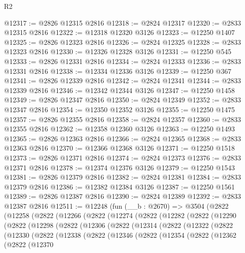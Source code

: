 \begin{lexlean}{R2}
\begin{coremodule}
@12317 := @2826 @12315 @2816
@12318 := @2824 @12317
@12320 := @2833 @12315 @2816
@12322 := @12318 @12320 @3126
@12323 := @12250 @1407
@12325 := @2826 @12323 @2816
@12326 := @2824 @12325
@12328 := @2833 @12323 @2816
@12330 := @12326 @12328 @3126
@12331 := @12250 @545
@12333 := @2826 @12331 @2816
@12334 := @2824 @12333
@12336 := @2833 @12331 @2816
@12338 := @12334 @12336 @3126
@12339 := @12250 @367
@12341 := @2826 @12339 @2816
@12342 := @2824 @12341
@12344 := @2833 @12339 @2816
@12346 := @12342 @12344 @3126
@12347 := @12250 @1458
@12349 := @2826 @12347 @2816
@12350 := @2824 @12349
@12352 := @2833 @12347 @2816
@12354 := @12350 @12352 @3126
@12355 := @12250 @1475
@12357 := @2826 @12355 @2816
@12358 := @2824 @12357
@12360 := @2833 @12355 @2816
@12362 := @12358 @12360 @3126
@12363 := @12250 @1493
@12365 := @2826 @12363 @2816
@12366 := @2824 @12365
@12368 := @2833 @12363 @2816
@12370 := @12366 @12368 @3126
@12371 := @12250 @1518
@12373 := @2826 @12371 @2816
@12374 := @2824 @12373
@12376 := @2833 @12371 @2816
@12378 := @12374 @12376 @3126
@12379 := @12250 @1543
@12381 := @2826 @12379 @2816
@12382 := @2824 @12381
@12384 := @2833 @12379 @2816
@12386 := @12382 @12384 @3126
@12387 := @12250 @1561
@12389 := @2826 @12387 @2816
@12390 := @2824 @12389
@12392 := @2833 @12387 @2816
@12511 := @12248
    (fun (__b : @2670) =>
    @3504
      (@2822
        (@12258
          (@2822
            (@12266
              (@2822
                (@12274
                  (@2822
                    (@12282
                      (@2822
                        (@12290
                          (@2822
                            (@12298
                              (@2822
                                (@12306
                                  (@2822
                                    (@12314
                                      (@2822
                                        (@12322
                                          (@2822
                                            (@12330
                                              (@2822
                                                (@12338
                                                  (@2822
                                                    (@12346
                                                      (@2822
                                                        (@12354
                                                          (@2822
                                                            (@12362
                                                              (@2822
                                                                (@12370

\end{coremodule}
\end{lexlean}
